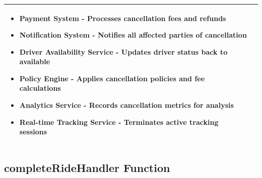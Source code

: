 \documentclass[11pt,a4paper]{article}
\begin{document}
\begin{longtable}{|p{3cm}|p{12cm}|}
\begin{itemize}[nosep]
\item Payment System - Processes cancellation fees and refunds
\item Notification System - Notifies all affected parties of cancellation
\item Driver Availability Service - Updates driver status back to available
\item Policy Engine - Applies cancellation policies and fee calculations
\item Analytics Service - Records cancellation metrics for analysis
\item Real-time Tracking Service - Terminates active tracking sessions
\end{itemize} \\
\hline
\end{longtable}

\subsection{completeRideHandler Function}
\end{document}
